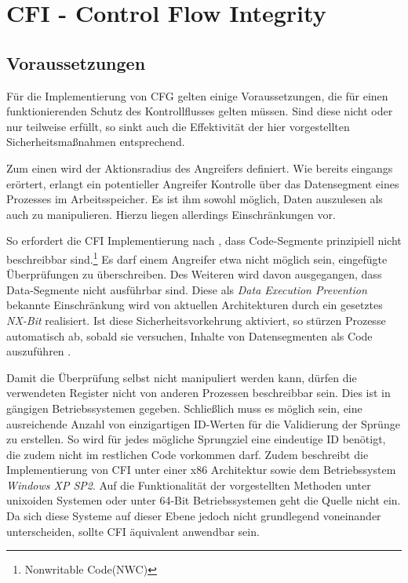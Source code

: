 \section{CFI - Control Flow Integrity}
\subsection{Voraussetzungen}
\label{sec:voraussetzungen}

Für die Implementierung von CFG gelten einige Voraussetzungen, die für einen funktionierenden Schutz des Kontrollflusses gelten müssen. Sind diese nicht oder nur teilweise erfüllt, so sinkt auch die Effektivität der hier vorgestellten Sicherheitsmaßnahmen entsprechend.

Zum einen wird der Aktionsradius des Angreifers definiert. Wie bereits eingangs erörtert, erlangt ein potentieller Angreifer Kontrolle über das Datensegment eines Prozesses im Arbeitsspeicher. Es ist ihm sowohl möglich, Daten auszulesen als auch zu manipulieren. Hierzu liegen allerdings Einschränkungen vor.

So erfordert die CFI Implementierung nach \cite{Abadi.2009}, dass Code-Segmente prinzipiell nicht beschreibbar sind.\footnote{Nonwritable Code(NWC)} Es darf einem Angreifer etwa nicht möglich sein, eingefügte Überprüfungen zu überschreiben. Des Weiteren wird davon ausgegangen, dass Data-Segmente nicht ausführbar sind. Diese als \emph{Data Execution Prevention} bekannte Einschränkung wird von aktuellen Architekturen durch ein gesetztes \emph{NX-Bit} realisiert. Ist diese Sicherheitsvorkehrung aktiviert, so stürzen Prozesse automatisch ab, sobald sie versuchen, Inhalte von Datensegmenten als Code auszuführen \cite{Goktas.}.

Damit die Überprüfung selbst nicht manipuliert werden kann, dürfen die verwendeten Register nicht von anderen Prozessen beschreibbar sein. Dies ist in gängigen Betriebssystemen gegeben.
Schließlich muss es möglich sein, eine ausreichende Anzahl von einzigartigen ID-Werten für die Validierung der Sprünge zu erstellen. So wird für jedes mögliche Sprungziel eine eindeutige ID benötigt, die zudem nicht im restlichen Code vorkommen darf. Zudem beschreibt \cite{Abadi.2009} die Implementierung von CFI unter einer x86 Architektur sowie dem Betriebssystem \emph{Windows XP SP2}. Auf die Funktionalität der vorgestellten Methoden unter unixoiden Systemen oder unter 64-Bit Betriebssystemen geht die Quelle nicht ein. Da sich diese Systeme auf dieser Ebene jedoch nicht grundlegend voneinander unterscheiden, sollte CFI äquivalent anwendbar sein.


